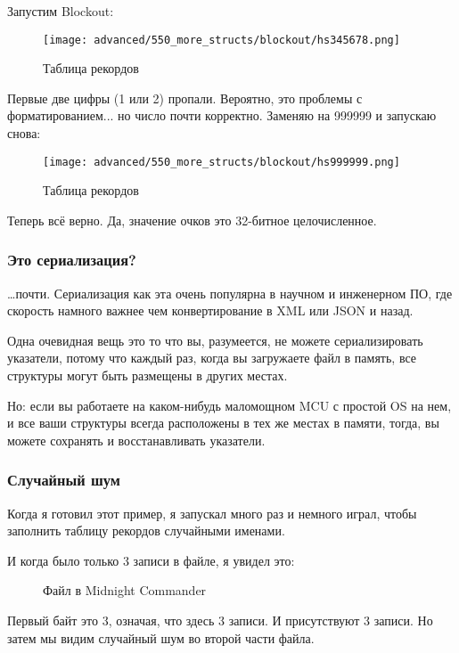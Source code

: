 Запустим Blockout:

\begin{figure}[H]
\centering
\texttt{[image: advanced/550\_more\_structs/blockout/hs345678.png]}
\caption{Таблица рекордов}
\end{figure}

Первые две цифры (1 или 2) пропали. Вероятно, это проблемы с форматированием... но число почти корректно.
Заменяю на 999999 и запускаю снова:

\begin{figure}[H]
\centering
\texttt{[image: advanced/550\_more\_structs/blockout/hs999999.png]}
\caption{Таблица рекордов}
\end{figure}

Теперь всё верно. Да, значение очков это 32-битное целочисленное.

\subsubsection{Это сериализация?}

\dots почти.
Сериализация как эта очень популярна в научном и инженерном ПО, где скорость намного важнее чем конвертирование в
\ac{XML} или \ac{JSON} и назад.

Одна очевидная вещь это то что вы, разумеется, не можете сериализировать указатели, потому что каждый раз, когда вы загружаете
файл в память, все структуры могут быть размещены в других местах.

Но: если вы работаете на каком-нибудь маломощном \ac{MCU} с простой \ac{OS} на нем,
и все ваши структуры всегда расположены в тех же местах в памяти, тогда, вы можете сохранять и восстанавливать указатели.

\subsubsection{Случайный шум}

Когда я готовил этот пример, я запускал  много раз и немного играл, чтобы заполнить таблицу рекордов
случайными именами.

И когда было только 3 записи в файле, я увидел это:

\begin{figure}[H]
\centering
{}
\caption{Файл  в Midnight Commander}
\end{figure}

Первый байт это 3, означая, что здесь 3 записи.
И присутствуют 3 записи.
Но затем мы видим случайный шум во второй части файла.

